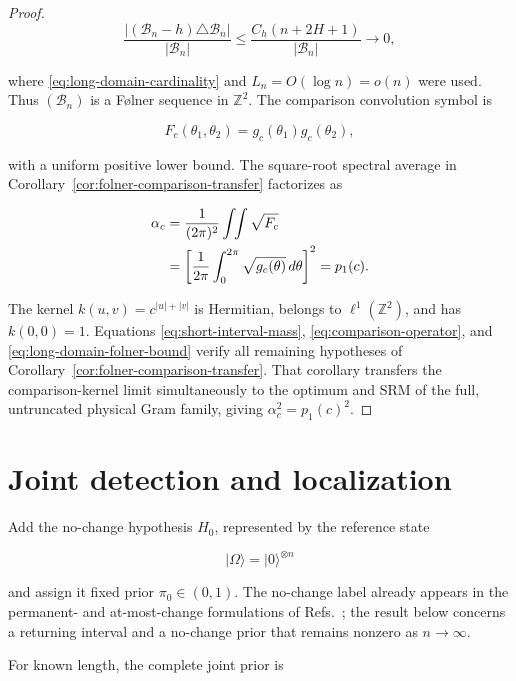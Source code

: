 \begin{proof}
\begin{equation}\label{eq:long-domain-folner-bound}
\frac{|(\mathcal B_n-h)\triangle\mathcal B_n|}{|\mathcal B_n|}
\le
\frac{C_h(n+2H+1)}{|\mathcal B_n|}
\longrightarrow0,
\end{equation}

where \eqref{eq:long-domain-cardinality} and \(L_n=O(\log n)=o(n)\) were
used. Thus \((\mathcal B_n)\) is a Følner sequence in \(\mathbb Z^2\).
The comparison convolution symbol is

\[
F_c(\theta_1,\theta_2)=g_c(\theta_1)g_c(\theta_2),
\]

with a uniform positive lower bound. The square-root spectral average in
Corollary~\ref{cor:folner-comparison-transfer} factorizes as

\begin{align}\label{eq:endpoint-factorization}
\alpha_c
&=\frac1{(2\pi)^2}\int\!\!\int\sqrt{F_c} \notag\\
&=\left[\frac1{2\pi}\int_0^{2\pi}
\sqrt{g_c(\theta)}\,d\theta\right]^2
=p_1(c).
\end{align}

The kernel \(k(u,v)=c^{|u|+|v|}\) is Hermitian, belongs to
\(\ell^1(\mathbb Z^2)\), and has \(k(0,0)=1\). Equations
\eqref{eq:short-interval-mass}, \eqref{eq:comparison-operator}, and
\eqref{eq:long-domain-folner-bound} verify all remaining hypotheses of
Corollary~\ref{cor:folner-comparison-transfer}. That corollary transfers the
comparison-kernel limit simultaneously to the optimum and SRM of the full,
untruncated physical Gram family, giving
\(\alpha_c^2=p_1(c)^2\).
\end{proof}

\section{Joint detection and localization}\label{joint-detection-and-exact-localization}

Add the no-change hypothesis \(H_0\), represented by the reference state

\[
|\Omega\rangle=|0\rangle^{\otimes n}
\]

and assign it fixed prior \(\pi_0\in(0,1)\). The no-change label already
appears in the permanent- and at-most-change formulations of
Refs.~\cite{sentis2016,mohan2023}; the result below concerns a returning
interval and a no-change prior that remains nonzero as \(n\to\infty\).

For known length, the complete joint prior is

